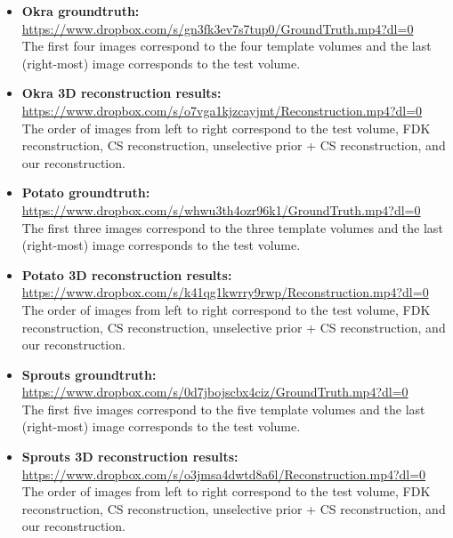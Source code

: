 \documentclass{article}
\begin{document}
\begin{itemize}
\item \textbf{Okra groundtruth:} \\ \url{https://www.dropbox.com/s/gn3fk3ev7s7tup0/GroundTruth.mp4?dl=0}\\
	The first four images correspond to the four template volumes and the last (right-most) image corresponds to the test volume.
\item \textbf{Okra 3D reconstruction results:} \\ \url{https://www.dropbox.com/s/o7vga1kjzcayjmt/Reconstruction.mp4?dl=0}\\
       The order of images from left to right correspond to the test volume, FDK reconstruction, CS reconstruction, unselective prior + CS reconstruction, and our reconstruction. 
\item \textbf{Potato groundtruth:} \\ \url{https://www.dropbox.com/s/whwu3th4ozr96k1/GroundTruth.mp4?dl=0}\\
	The first three images correspond to the three template volumes and the last (right-most) image corresponds to the test volume.
\item \textbf{Potato 3D reconstruction results:}\\  \url{https://www.dropbox.com/s/k41qg1kwrry9rwp/Reconstruction.mp4?dl=0}\\
       The order of images from left to right correspond to the test volume, FDK reconstruction, CS reconstruction, unselective prior + CS reconstruction, and our reconstruction.
\item \textbf{Sprouts groundtruth:} \\ \url{https://www.dropbox.com/s/0d7jbojscbx4ciz/GroundTruth.mp4?dl=0}\\
	The first five images correspond to the five template volumes and the last (right-most) image corresponds to the test volume.
\item \textbf{Sprouts 3D reconstruction results:}\\  \url{https://www.dropbox.com/s/o3jmsa4dwtd8a6l/Reconstruction.mp4?dl=0}\\
       The order of images from left to right correspond to the test volume, FDK reconstruction, CS reconstruction, unselective prior + CS reconstruction, and our reconstruction.

\end{itemize}

\newpage

\end{document}
